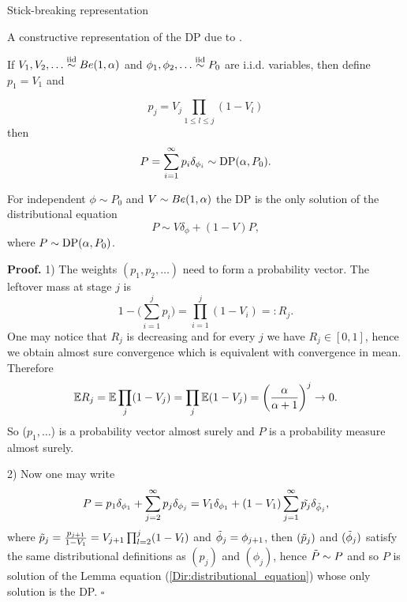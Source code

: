 \begin{frame}[allowframebreaks]{Stick-breaking representation}

A constructive representation of the DP due to \citet{sethuraman1994constructive}.
\begin{theorem}\label{theorem:sethuraman}
If $V_1, V_2, \ldots \stackrel{\mbox{\scriptsize{iid}}}{\sim} Be(1, \alpha)$ and $\phi_1, \phi_2, \ldots \stackrel{\mbox{\scriptsize{iid}}}{\sim} P_0$ are i.i.d. variables, then define $p_1=V_1$ and 

$$
p_j=V_j \prod_{1\leq l \leq j}(1-V_l)
$$ 
then 
$$
P=\sum_{i=1}^\infty p_i\delta_{\phi_i}\sim \text{DP}(\alpha, P_0).
$$
\end{theorem}

\pause

\begin{lemma}
For independent $\phi\sim P_0$ and $V\sim Be(1,\alpha)$ the DP is the only solution of the distributional equation 
\begin{equation*}\label{Dir:distributional_equation}
    P \sim V\delta_\phi + (1-V)P, 
\end{equation*}
where $P\sim \text{DP}(\alpha, P_0)$.
\end{lemma}


\framebreak

\textbf{Proof.}
1) The weights $(p_1, p_2,\ldots)$ need to form a probability vector. The leftover mass at stage $j$ is 
$$
1-\bigg(\sum_{i=1}^j p_i\bigg)=\prod_{i=1}^j(1-V_i) =: R_j.
$$
One may notice that $R_j$ is decreasing and for every $j$ we have $R_j\in [0,1]$, hence we obtain almost sure convergence which is equivalent with convergence in mean. Therefore
$$
\mathbb{E} R_j=\mathbb{E} \prod_j (1-V_j)= \prod_j \mathbb{E}(1-V_j) = \bigg( \frac{\alpha}{\alpha + 1}\bigg)^j \rightarrow 0.
$$
So ($p_1, \ldots$) is a probability vector almost surely and $P$ is a probability measure almost surely. 

\framebreak

2) Now one may write 
$$
P=p_1\delta_{\phi_1}+\sum_{j=2}^\infty p_j\delta_{\phi_j} = V_1\delta_{\phi_1}+(1-V_1)\sum_{j=1}^\infty \Tilde{p_j}\delta_{\Tilde{\phi}_j},
$$
where $\Tilde{p}_j=\frac{p_{j+1} }{1-V_1}=V_{j+1}\prod_{l=2}^j(1-V_l)$ and $\Tilde{\phi}_j=\phi_{j+1}$, then $(\Tilde{p}_j)$ and $(\Tilde{\phi}_j)$ satisfy the same distributional definitions as $(p_j)$ and $(\phi_j)$, hence $\Tilde{P}\sim P$ and so $P$ is solution of the Lemma equation (\ref{Dir:distributional_equation}) whose only solution is the DP.
\hfill $\square$
\end{frame}






